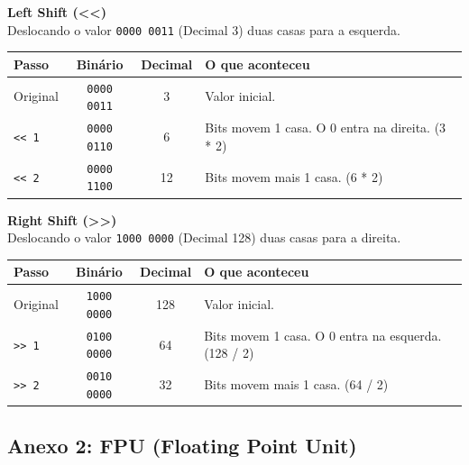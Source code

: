 \documentclass[12pt,a4paper]{article}
\begin{document}
\textbf{Left Shift (<<)}\\
Deslocando o valor \texttt{0000 0011} (Decimal 3) duas casas para a esquerda.
\begin{table}[H]
    \centering
    \begin{tabular}{lccl}
    \toprule
    \textbf{Passo} & \textbf{Binário} & \textbf{Decimal} & \textbf{O que aconteceu} \\
    \midrule
    Original & \texttt{0000 0011} & 3 & Valor inicial. \\
    \texttt{<< 1} & \texttt{0000 0110} & 6 & Bits movem 1 casa. O 0 entra na direita. (3 * 2) \\
    \texttt{<< 2} & \texttt{0000 1100} & 12 & Bits movem mais 1 casa. (6 * 2) \\
    \bottomrule
    \end{tabular}
\end{table}

\textbf{Right Shift (>>)}\\
Deslocando o valor \texttt{1000 0000} (Decimal 128) duas casas para a direita.
\begin{table}[H]
    \centering
    \begin{tabular}{lccl}
    \toprule
    \textbf{Passo} & \textbf{Binário} & \textbf{Decimal} & \textbf{O que aconteceu} \\
    \midrule
    Original & \texttt{1000 0000} & 128 & Valor inicial. \\
    \texttt{>> 1} & \texttt{0100 0000} & 64 & Bits movem 1 casa. O 0 entra na esquerda. (128 / 2) \\
    \texttt{>> 2} & \texttt{0010 0000} & 32 & Bits movem mais 1 casa. (64 / 2) \\
    \bottomrule
    \end{tabular}
\end{table}

\newpage
\subsection*{Anexo 2: FPU (Floating Point Unit)}
\label{anexo:2}
\end{document}
